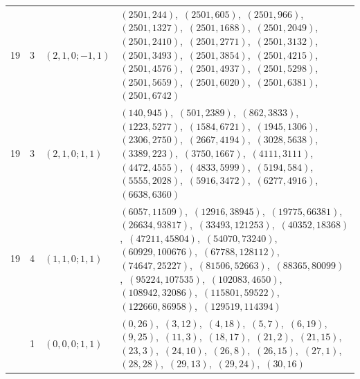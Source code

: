 \documentclass[11pt]{article}
\begin{document}
\begin{longtable}{@{}rrl>{\raggedright\arraybackslash}p{}@{}}
19 & 3 & $(2,1,0;-1,1)$ & $(2501,244)$,\allowbreak\ $(2501,605)$,\allowbreak\ $(2501,966)$,\allowbreak\ $(2501,1327)$,\allowbreak\ $(2501,1688)$,\allowbreak\ $(2501,2049)$,\allowbreak\ $(2501,2410)$,\allowbreak\ $(2501,2771)$,\allowbreak\ $(2501,3132)$,\allowbreak\ $(2501,3493)$,\allowbreak\ $(2501,3854)$,\allowbreak\ $(2501,4215)$,\allowbreak\ $(2501,4576)$,\allowbreak\ $(2501,4937)$,\allowbreak\ $(2501,5298)$,\allowbreak\ $(2501,5659)$,\allowbreak\ $(2501,6020)$,\allowbreak\ $(2501,6381)$,\allowbreak\ $(2501,6742)$\\
19 & 3 & $(2,1,0;1,1)$ & $(140,945)$,\allowbreak\ $(501,2389)$,\allowbreak\ $(862,3833)$,\allowbreak\ $(1223,5277)$,\allowbreak\ $(1584,6721)$,\allowbreak\ $(1945,1306)$,\allowbreak\ $(2306,2750)$,\allowbreak\ $(2667,4194)$,\allowbreak\ $(3028,5638)$,\allowbreak\ $(3389,223)$,\allowbreak\ $(3750,1667)$,\allowbreak\ $(4111,3111)$,\allowbreak\ $(4472,4555)$,\allowbreak\ $(4833,5999)$,\allowbreak\ $(5194,584)$,\allowbreak\ $(5555,2028)$,\allowbreak\ $(5916,3472)$,\allowbreak\ $(6277,4916)$,\allowbreak\ $(6638,6360)$\\
19 & 4 & $(1,1,0;1,1)$ & $(6057,11509)$,\allowbreak\ $(12916,38945)$,\allowbreak\ $(19775,66381)$,\allowbreak\ $(26634,93817)$,\allowbreak\ $(33493,121253)$,\allowbreak\ $(40352,18368)$,\allowbreak\ $(47211,45804)$,\allowbreak\ $(54070,73240)$,\allowbreak\ $(60929,100676)$,\allowbreak\ $(67788,128112)$,\allowbreak\ $(74647,25227)$,\allowbreak\ $(81506,52663)$,\allowbreak\ $(88365,80099)$,\allowbreak\ $(95224,107535)$,\allowbreak\ $(102083,4650)$,\allowbreak\ $(108942,32086)$,\allowbreak\ $(115801,59522)$,\allowbreak\ $(122660,86958)$,\allowbreak\ $(129519,114394)$\\
\addlinespace[3pt]
31 & 1 & $(0,0,0;1,1)$ & $(0,26)$,\allowbreak\ $(3,12)$,\allowbreak\ $(4,18)$,\allowbreak\ $(5,7)$,\allowbreak\ $(6,19)$,\allowbreak\ $(9,25)$,\allowbreak\ $(11,3)$,\allowbreak\ $(18,17)$,\allowbreak\ $(21,2)$,\allowbreak\ $(21,15)$,\allowbreak\ $(23,3)$,\allowbreak\ $(24,10)$,\allowbreak\ $(26,8)$,\allowbreak\ $(26,15)$,\allowbreak\ $(27,1)$,\allowbreak\ $(28,28)$,\allowbreak\ $(29,13)$,\allowbreak\ $(29,24)$,\allowbreak\ $(30,16)$\\

\end{longtable}
\end{document}
